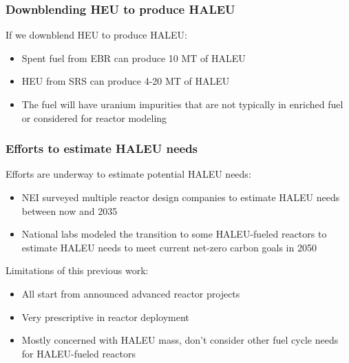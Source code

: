 \begin{frame}
    \frametitle{Downblending HEU to produce HALEU}
    If we downblend \gls{HEU} to produce \gls{HALEU}:
    \begin{itemize}
        \item Spent fuel from \gls{EBR} can produce 10 MT of \gls{HALEU}
              \cite{nuclear_energy_institute_establishing_2022}
        \item \gls{HEU} from \gls{SRS} can produce 4-20 MT of \gls{HALEU}
              \cite{nuclear_energy_institute_establishing_2022,regalbuto_addressing_2020}
        \item<2-> The fuel will have uranium impurities that are not typically 
              in enriched fuel or considered for reactor modeling 
              \cite{nelson_foreign_2010,vaden_isotopic_2018}
    \end{itemize}
\end{frame}

\begin{frame}
    \frametitle{Efforts to estimate HALEU needs}
    Efforts are underway to estimate potential \gls{HALEU} needs:
    \begin{itemize}
        \item \gls{NEI} surveyed multiple reactor design companies
              to estimate \gls{HALEU} needs between now and 2035 
              \cite{korsnick_updated_2021,nuclear_energy_institute_establishing_2022}
        \item National labs modeled the transition to some 
              \gls{HALEU}-fueled reactors to estimate \gls{HALEU} needs 
              to meet current net-zero carbon goals in 2050 \cite{dixon_estimated_2022}
    \end{itemize}
    \pause
    Limitations of this previous work:
    \begin{itemize}
        \item All start from announced advanced reactor projects
        \item Very prescriptive in reactor deployment
        \item<3-> Mostly concerned with \gls{HALEU} mass, don't consider 
              other fuel cycle needs for \gls{HALEU}-fueled reactors
    \end{itemize}
\end{frame}

